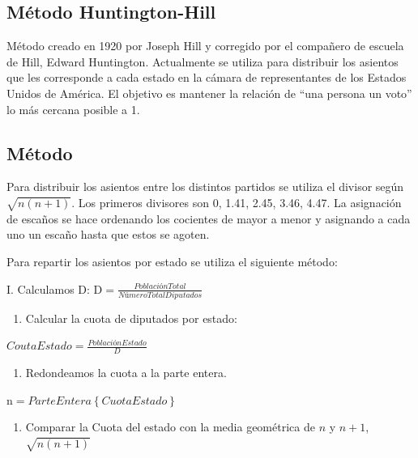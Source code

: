 \documentclass[12pt,a4paper,]{book}
\providecommand{\tightlist}{%
  \setlength{\itemsep}{0pt}\setlength{\parskip}{0pt}}
\numberwithin{dummy}{section}
\theoremstyle{ocrenumbox}
\theoremstyle{blacknumex}
\theoremstyle{blacknumbox}
\theoremstyle{ocrenum}
\theoremstyle{ocrenum}
\begin{document}
\hypertarget{muxe9todo-huntington-hill}{%
\subsection{Método Huntington-Hill}\label{muxe9todo-huntington-hill}}

Método creado en 1920 por Joseph Hill y corregido por el compañero de
escuela de Hill, Edward Huntington. Actualmente se utiliza para
distribuir los asientos que les corresponde a cada estado en la cámara
de representantes de los Estados Unidos de América. El objetivo es
mantener la relación de ``una persona un voto'' lo más cercana posible a
1.

\hypertarget{muxe9todo}{%
\subsection{Método}\label{muxe9todo}}

Para distribuir los asientos entre los distintos partidos se utiliza el
divisor según \(\sqrt{n(n+1)}\). Los primeros divisores son 0, 1.41,
2.45, 3.46, 4.47. La asignación de escaños se hace ordenando los
cocientes de mayor a menor y asignando a cada uno un escaño hasta que
estos se agoten.

Para repartir los asientos por estado se utiliza el siguiente método:

I. Calculamos D:
\(\textrm{D} = \frac{Población Total}{NúmeroTotalDiputados}\)

\begin{enumerate}
\def\labelenumi{\Roman{enumi}.}
\setcounter{enumi}{1}
\tightlist
\item
  Calcular la cuota de diputados por estado:
\end{enumerate}

\(CoutaEstado = \frac{Población Estado}{D}\)

\begin{enumerate}
\def\labelenumi{\Roman{enumi}.}
\setcounter{enumi}{2}
\tightlist
\item
  Redondeamos la cuota a la parte entera.
\end{enumerate}

\(\textrm{n} = ParteEntera\left\{{Cuota Estado}\right\}\)

\begin{enumerate}
\def\labelenumi{\Roman{enumi}.}
\setcounter{enumi}{3}
\tightlist
\item
  Comparar la Cuota del estado con la media geométrica de \(n\) y
  \(n+1\), \(\sqrt{n(n+1)}\)
\end{enumerate}
\end{document}
